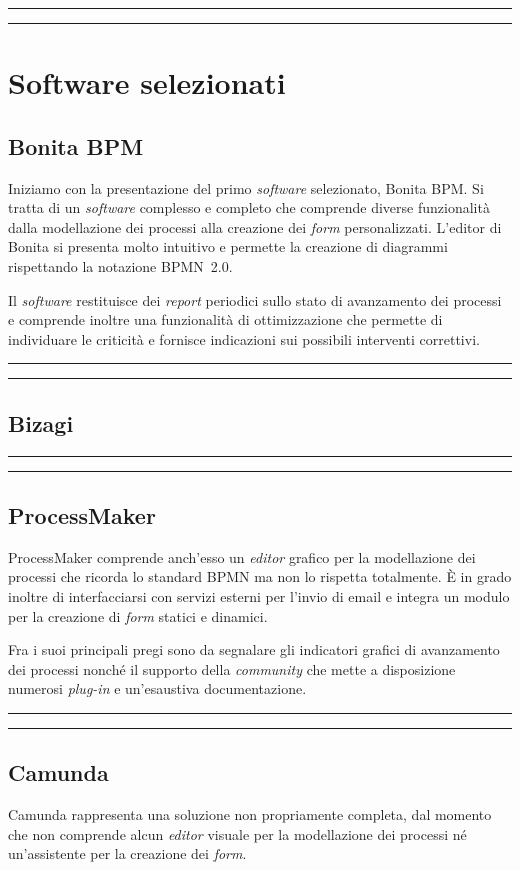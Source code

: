 \documentclass[a4paper,10pt]{article}
\newcommand{\inglese}[1]{\foreignlanguage{english}{\textit{#1}}}
\newcommand{\sw}{\inglese{software}\xspace}
\newcommand{\cambioslide}{%
\begin{center}
\Large
\rule[4pt]{0.2\linewidth}{.7pt} \ding{167} \rule[4pt]{0.2\linewidth}{.7pt}
\end{center}
}
\begin{document}
\cambioslide

\section{Software selezionati}

\subsection{Bonita BPM}
Iniziamo con la presentazione del primo \sw selezionato, Bonita BPM. Si tratta di un \sw complesso e completo che comprende diverse funzionalità dalla modellazione dei processi alla creazione dei \inglese{form} personalizzati.
L'editor di Bonita si presenta molto intuitivo e permette la creazione di diagrammi rispettando la notazione BPMN~2.0.

Il \sw restituisce dei \inglese{report} periodici sullo stato di avanzamento dei processi e comprende inoltre una funzionalità di ottimizzazione che permette di individuare le criticità e fornisce indicazioni sui possibili interventi correttivi.

\cambioslide

\subsection{Bizagi}

\cambioslide

\subsection{ProcessMaker}
ProcessMaker comprende anch'esso un \inglese{editor} grafico per la modellazione dei processi che ricorda lo standard BPMN ma non lo rispetta totalmente. È in grado inoltre di interfacciarsi con servizi esterni per l'invio di email e integra un modulo per la creazione di \inglese{form} statici e dinamici.

Fra i suoi principali pregi sono da segnalare gli indicatori grafici di avanzamento dei processi nonché il supporto della \inglese{community} che mette a disposizione numerosi \inglese{plug-in} e un'esaustiva documentazione.
\cambioslide

\subsection{Camunda}
Camunda rappresenta una soluzione non propriamente completa, dal momento che non comprende alcun \inglese{editor} visuale per la modellazione dei processi né un'assistente per la creazione dei \inglese{form}.
\end{document}
